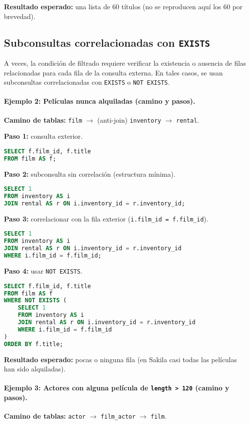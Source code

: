 \documentclass[12pt,a4paper]{article}
\begin{document}
\textbf{Resultado esperado:} una lista de 60 títulos (no se reproducen aquí los 60 por brevedad).

\subsection*{Subconsultas correlacionadas con \texttt{EXISTS}}

A veces, la condición de filtrado requiere verificar la existencia o ausencia de filas relacionadas para cada fila de la consulta externa. En tales casos, se usan subconsultas correlacionadas con \texttt{EXISTS} o \texttt{NOT EXISTS}. 

\paragraph{Ejemplo 2: Películas nunca alquiladas (camino y pasos).}
\textbf{Camino de tablas:} \texttt{film} $\rightarrow$ (anti-join) \texttt{inventory} $\rightarrow$ \texttt{rental}.

\textbf{Paso 1:} consulta exterior.
\begin{lstlisting}[language=SQL]
SELECT f.film_id, f.title
FROM film AS f;
\end{lstlisting}

\textbf{Paso 2:} subconsulta sin correlación (estructura mínima).
\begin{lstlisting}[language=SQL]
SELECT 1
FROM inventory AS i
JOIN rental AS r ON i.inventory_id = r.inventory_id;
\end{lstlisting}

\textbf{Paso 3:} correlacionar con la fila exterior (\texttt{i.film\_id = f.film\_id}).
\begin{lstlisting}[language=SQL]
SELECT 1
FROM inventory AS i
JOIN rental AS r ON i.inventory_id = r.inventory_id
WHERE i.film_id = f.film_id;
\end{lstlisting}

\textbf{Paso 4:} usar \texttt{NOT EXISTS}.
\begin{lstlisting}[language=SQL]
SELECT f.film_id, f.title
FROM film AS f
WHERE NOT EXISTS (
    SELECT 1
    FROM inventory AS i
    JOIN rental AS r ON i.inventory_id = r.inventory_id
    WHERE i.film_id = f.film_id
)
ORDER BY f.title;
\end{lstlisting}

\textbf{Resultado esperado:} pocas o ninguna fila (en Sakila casi todas las películas han sido alquiladas).

\paragraph{Ejemplo 3: Actores con alguna película de \texttt{length > 120} (camino y pasos).}
\textbf{Camino de tablas:} \texttt{actor} $\rightarrow$ \texttt{film\_actor} $\rightarrow$ \texttt{film}.
\end{document}
